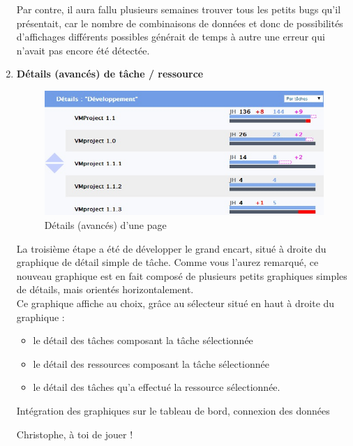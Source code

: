 \documentclass[12pt]{report}
\begin{document}
\begin{enumerate}
Par contre, il aura fallu plusieurs semaines trouver tous les petits bugs qu'il présentait, car le nombre de combinaisons de données et donc de possibilités d'affichages différents possibles générait de temps à autre une erreur qui n'avait pas encore été détectée.\\


\item \textbf{Détails (avancés) de tâche / ressource}\\

\begin{figure}[H]
	\centering
	\includegraphics[width=1\textwidth]{pictures/realisations/detailsTache.jpg}
	\caption{Détails (avancés) d'une page}
	\label{20}
\end{figure}

La troisième étape a été de développer le grand encart, situé à droite du graphique de détail simple de tâche. Comme vous l'aurez remarqué, ce nouveau graphique est en fait composé de plusieurs petits graphiques simples de détails, mais orientés horizontalement.\\

Ce graphique affiche au choix, grâce au sélecteur situé en haut à droite du graphique :\\

\begin{itemize}
\item le détail des tâches composant la tâche sélectionnée
\item le détail des ressources composant la tâche sélectionnée
\item le détail des tâches qu'a effectué la ressource sélectionnée.\\
\end{itemize}


Intégration des graphiques sur le tableau de bord, connexion des données

Christophe, à toi de jouer !




\end{enumerate}
\end{document}
